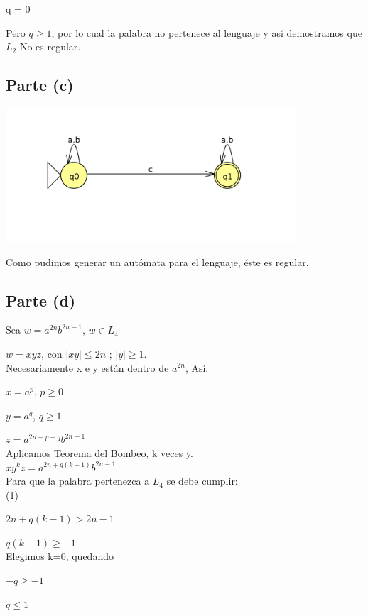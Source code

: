 \documentclass[11pt,letterpaper]{article}
\begin{document}
q = 0

Pero $q \geqslant 1$, por lo cual la palabra no pertenece al lenguaje y así demostramos que $L_{2}$ No es regular.

\subsection{Parte (c)}
\includegraphics[height=5cm]{tarea_3-c.png}

Como pudimos generar un autómata para el lenguaje, éste es regular.


\subsection{Parte (d)}
Sea $w = a^{2n}b^{2n-1}$, $w \in  L_{4}$

$w = xyz$, con $|xy| \leqslant 2n$ ; $|y| \geqslant 1$.
 \\

Necesariamente x e y están dentro de $a^{2n}$, Así:

$x = a^p$, $p \geqslant 0$

$y = a^q$, $q \geqslant 1$

$z = a^{2n-p-q}b^{2n-1}$
 \\

Aplicamos Teorema del Bombeo, k veces y.
 \\
 
$xy^kz = a^{2n+q(k-1)}b^{2n-1}$
 \\

Para que la palabra pertenezca a $L_{4}$ se debe cumplir:
 \\
 
(1)

$2n+q(k-1) > 2n-1$

$q(k-1) \geqslant -1$
 \\
 
Elegimos k=0, quedando

$-q \geqslant -1$

$q \leqslant 1$
\end{document}
